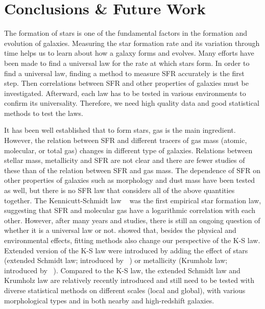 \chapter{Conclusions \& Future Work}
\label{ch: summary}
The formation of stars is one of the fundamental factors in the formation and evolution of galaxies.
Measuring the star formation rate and its variation through time helps us to learn about how a galaxy forms and evolves.
Many efforts have been made to find a universal law for the rate at which stars form.
In order to find a universal law, finding a method to measure SFR accurately is the first step.
Then correlations between SFR and other properties of galaxies must be investigated.
Afterward, each law has to be tested in various environments to confirm its universality.
Therefore, we need high quality data and good statistical methods to test the laws.

It has been well established that to form stars, gas is the main ingredient.
However, the relation between SFR and different tracers of gas mass (atomic, molecular, or total gas) changes in different type of galaxies.
Relations between stellar mass, metallicity and SFR are not clear and there are fewer studies of these than of the relation between SFR and gas mass.
The dependence of SFR on other properties of galaxies such as morphology and dust mass have been tested as well, but there is no SFR law that considers all of the above quantities together.
The Kennicutt-Schmidt law ~\citep{Schmidt59, Kennicutt98b} was the first empirical star formation law, suggesting that SFR and molecular gas have a logarithmic correlation with each other. 
However, after many years and studies, there is still an ongoing question of whether it is a universal law or not.
\citet{Shetty13} showed that, besides the physical and environmental effects, fitting methods also change our perspective of the K-S law.
Extended version of the K-S law were introduced by adding the effect of stars (extended Schmidt law; introduced by ~\citealt{Shi11}) or metallicity (Krumholz law; introduced by ~\citealt{Krumholz09}).
Compared to the K-S law, the extended Schmidt law and Krumholz law are relatively recently introduced and still need to be tested with diverse statistical methods on different scales (local and global), with various morphological types and in both nearby and high-redshift galaxies.

